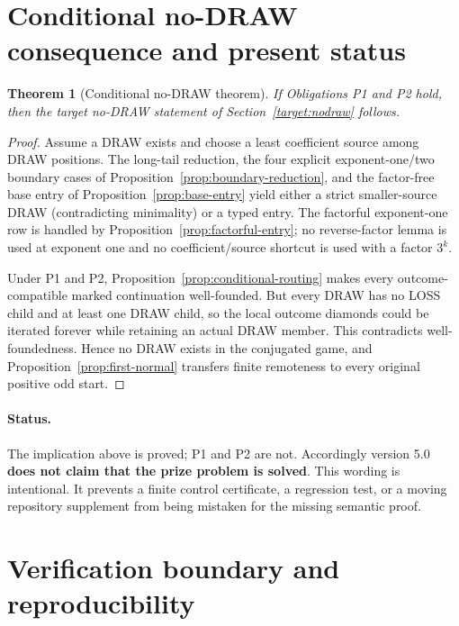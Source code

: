 \documentclass[11pt]{article}
\newtheorem{theorem}{Theorem}[section]
\begin{document}
\section{Conditional no-DRAW consequence and present status}

\begin{theorem}[Conditional no-DRAW theorem]\label{thm:conditional}
If Obligations P1 and P2 hold, then the target no-DRAW statement of
Section~\ref{target:nodraw} follows.
\end{theorem}

\begin{proof}
Assume a DRAW exists and choose a least coefficient source among DRAW
positions.  The long-tail reduction, the four explicit exponent-one/two
boundary cases of Proposition~\ref{prop:boundary-reduction}, and the
factor-free base entry of Proposition~\ref{prop:base-entry} yield either a
strict smaller-source DRAW (contradicting minimality) or a typed entry.  The
factorful exponent-one row is handled by Proposition~\ref{prop:factorful-entry};
no reverse-factor lemma is used at exponent one and no coefficient/source
shortcut is used with a factor $3^k$.

Under P1 and P2, Proposition~\ref{prop:conditional-routing} makes every
outcome-compatible marked continuation well-founded.  But every DRAW has no
LOSS child and at least one DRAW child, so the local outcome diamonds could be
iterated forever while retaining an actual DRAW member.  This contradicts
well-foundedness.  Hence no DRAW exists in the conjugated game, and
Proposition~\ref{prop:first-normal} transfers finite remoteness to every
original positive odd start.
\end{proof}

\paragraph{Status.}
The implication above is proved; P1 and P2 are not.  Accordingly version 5.0
\textbf{does not claim that the prize problem is solved}.  This wording is
intentional.  It prevents a finite control certificate, a regression test, or
a moving repository supplement from being mistaken for the missing semantic
proof.

\section{Verification boundary and reproducibility}
\end{document}
